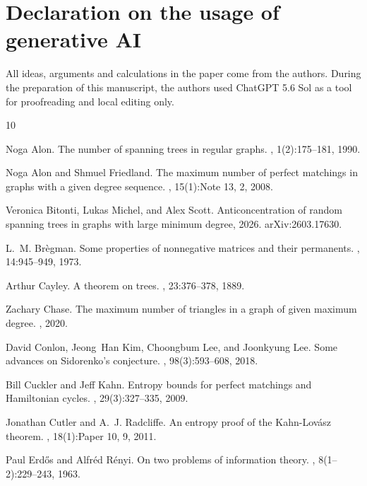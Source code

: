 \documentclass[10pt,a4paper]{amsart}
\numberwithin{equation}{section}
\theoremstyle{definition}
\theoremstyle{remark}
\begin{document}
\section*{Declaration on the usage of generative AI}
All ideas, arguments and calculations in the paper come from the authors. During the preparation of this manuscript, the authors used ChatGPT 5.6 Sol as a tool for proofreading and local editing only.

\begin{thebibliography}{10}

Noga Alon.
\newblock The number of spanning trees in regular graphs.
, 1(2):175--181, 1990.

Noga Alon and Shmuel Friedland.
\newblock The maximum number of perfect matchings in graphs with a given degree sequence.
, 15(1):Note 13, 2, 2008.

Veronica Bitonti, Lukas Michel, and Alex Scott.
\newblock Anticoncentration of random spanning trees in graphs with large minimum degree, 2026.
\newblock arXiv:2603.17630.

L.~M. Br{\`e}gman.
\newblock Some properties of nonnegative matrices and their permanents.
, 14:945--949, 1973.

Arthur Cayley.
\newblock A theorem on trees.
, 23:376--378, 1889.

Zachary Chase.
\newblock The maximum number of triangles in a graph of given maximum degree.
, 2020.

David Conlon, Jeong~Han Kim, Choongbum Lee, and Joonkyung Lee.
\newblock Some advances on {S}idorenko's conjecture.
, 98(3):593--608, 2018.

Bill Cuckler and Jeff Kahn.
\newblock Entropy bounds for perfect matchings and {H}amiltonian cycles.
, 29(3):327--335, 2009.

Jonathan Cutler and A.~J. Radcliffe.
\newblock An entropy proof of the {K}ahn-{L}ov\'{a}sz theorem.
, 18(1):Paper 10, 9, 2011.

Paul Erd{\H{o}}s and Alfr{\'e}d R{\'e}nyi.
\newblock On two problems of information theory.
, 8(1--2):229--243, 1963.


\end{thebibliography}
\end{document}
